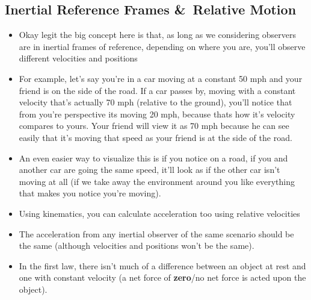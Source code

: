 \documentclass[openany]{book}
\begin{document}
\subsection{Inertial Reference Frames \&\ Relative Motion}
\begin{itemize}
    \item Okay legit the big concept here is that, as long as we considering observers are in inertial frames of reference, depending on where you are, you'll observe different velocities and positions
    \item For example, let's say you're in a car moving at a constant 50 mph and your friend is on the side of the road. If a car passes by, moving with a constant velocity that's actually 70 mph (relative to the ground), you'll notice that from you're perspective its moving 20 mph, because thats how it's velocity compares to yours. Your friend will view it as 70 mph because he can see easily that it's moving that speed as your friend is at the side of the road.
    \item An even easier way to visualize this is if you notice on a road, if you and another car are going the same speed, it'll look as if the other car isn't moving at all (if we take away the environment around you like everything that makes you notice you're moving).
    \item Using kinematics, you can calculate acceleration too using relative velocities
    \item The acceleration from any inertial observer of the same scenario should be the same (although velocities and positions won't be the same).
    \item In the first law, there isn't much of a difference between an object at rest and one with constant velocity (a net force of {\bfseries{zero}}/no net force is acted upon the object).
\end{itemize}
\end{document}
